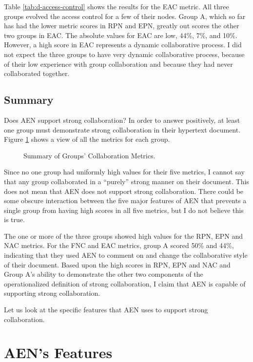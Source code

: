Table \ref{tab:d-access-control} shows the results for the EAC metric.  All
three groups evolved the access control for a few of their nodes.  Group
A, which so far has had the lower metric scores in RPN and EPN, greatly
out scores the other two groups in EAC.  The absolute values for EAC are
low, 44\%, 7\%, and 10\%.  However, a high score in EAC represents a
dynamic collaborative process.  I did not expect the three groups to have
very dynamic collaborative process, because of their low experience with
group collaboration and because they had never collaborated together.

\subsection{Summary}


Does AEN support strong collaboration?  In order to answer positively, at
least one group must demonstrate strong collaboration in their hypertext
document. Figure \ref{fig:op-def} shows a view of all the metrics for each
group.

\begin{figure}[htbp]
  \centerline{}
 \caption{Summary of Groups' Collaboration Metrics.}
 \label{fig:op-def}
\end{figure}

Since no one group had uniformly high values for their five metrics, I
cannot say that any group collaborated in a ``purely'' strong manner on their
document.  This does not mean that AEN does not support strong
collaboration. There could be some obscure interaction between the five
major features of AEN that prevents a single group from having high scores
in all five metrics, but I do not believe this is true.

The one or more of the three groups showed high values for the RPN, EPN and
NAC metrics.  For the FNC and EAC metrics, group A scored 50\% and 44\%,
indicating that they used AEN to comment on and change the collaborative
style of their document.  Based upon the high scores in RPN, EPN and NAC
and Group A's ability to demonstrate the other two components of the
operationalized definition of strong collaboration, I claim that AEN is
capable of supporting strong collaboration.

Let us look at the specific features that AEN uses to support strong
collaboration.

\section{AEN's Features}
\label{sec:Tools}

